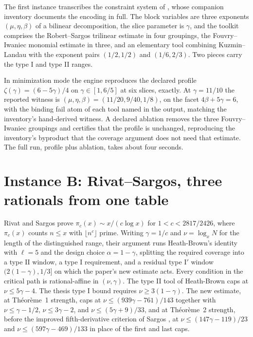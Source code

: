 \documentclass[11pt]{article}
\begin{document}
The first instance transcribes the constraint system of
\cite{ross-reduction}, whose companion inventory \cite{ross-inventory}
documents the encoding in full. The block variables are three exponents
$(\mu,\eta,\beta)$ of a bilinear decomposition, the slice parameter is
$\gamma$, and the toolkit comprises the Robert--Sargos trilinear
estimate \cite{robert-sargos} in four groupings, the Fouvry--Iwaniec
monomial estimate \cite{fouvry-iwaniec} in three, and an elementary
tool combining Kuzmin--Landau with the exponent pairs $(1/2,1/2)$ and
$(1/6,2/3)$. Two pieces carry the type I and type II ranges.

In minimization mode the engine reproduces the declared profile
$\zeta(\gamma)=(6-5\gamma)/4$ on $\gamma\in[1,6/5]$ at six slices,
exactly. At $\gamma=11/10$ the reported witness is
$(\mu,\eta,\beta)=(11/20,9/40,1/8)$, on the facet $4\beta+5\gamma=6$,
with the binding fail atom of each tool named in the output, matching
the inventory's hand-derived witness. A declared ablation removes the
three Fouvry--Iwaniec groupings and certifies that the profile is
unchanged, reproducing the inventory's byproduct that the coverage
argument does not need that estimate. The full run, profile plus
ablation, takes about four seconds.

\section{Instance B: Rivat--Sargos, three rationals from one table}
\label{sec:rs}

Rivat and Sargos \cite{rivat-sargos} prove
$\pi_c(x)\sim x/(c\log x)$ for $1<c<2817/2426$, where $\pi_c(x)$
counts $n\le x$ with $\lfloor n^c\rfloor$ prime. Writing
$\gamma=1/c$ and $\nu=\log_x N$ for the length of the distinguished
range, their argument runs Heath-Brown's identity \cite{heath-brown-id}
with $\ell=5$ and the design choice $\alpha=1-\gamma$, splitting the
required coverage into a type II window, a type I requirement, and a
residual type $\mathrm{I}'$ window $(2(1-\gamma),1/3]$ on which the
paper's new estimate acts. Every condition in the critical path is
rational-affine in $(\nu,\gamma)$. The type II tool of Heath-Brown
\cite{heath-brown-ps} caps at $\nu\le5\gamma-4$. The thesis type I
bound requires $\nu\ge3(1-\gamma)$. The new estimate, at
Th\'eor\`eme~1 strength, caps at
$\nu\le(939\gamma-761)/143$ together with $\nu\le\gamma-1/2$,
$\nu\le3\gamma-2$, and $\nu\le(5\gamma+9)/33$, and at Th\'eor\`eme~2
strength, before the improved fifth-derivative criterion of Sargos
\cite{sargos-crit}, at $\nu\le(147\gamma-119)/23$ and
$\nu\le(597\gamma-469)/133$ in place of the first and last caps.
\end{document}
